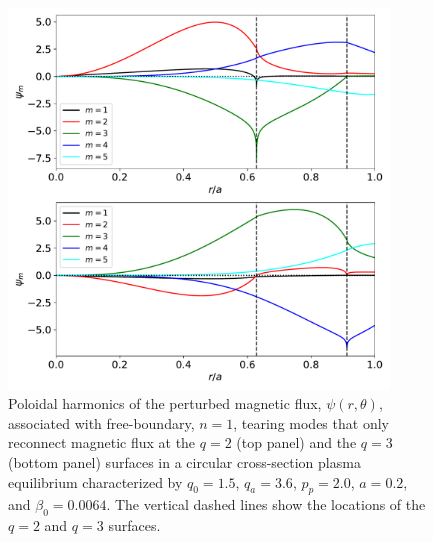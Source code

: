 \documentclass[12pt,prb,aps]{revtex4-1}
\begin{document}
\begin{figure}
\centerline{\includegraphics[width=0.9\textwidth]{Fig8.pdf}}
\caption{Poloidal harmonics of the perturbed magnetic flux, $\psi(r,\theta)$,  associated with free-boundary, $n=1$, tearing modes that only reconnect magnetic flux at the $q=2$  (top panel) and the $q=3$ (bottom panel) surfaces in a 
circular cross-section plasma equilibrium characterized by $q_0=1.5$, $q_a= 3.6$, $p_p=2.0$,
$a=0.2$, and $\beta_0 =0.0064$. The vertical dashed lines show the locations of the $q=2$ and $q=3$ surfaces. \label{fig8}}
\end{figure}
\end{document}
